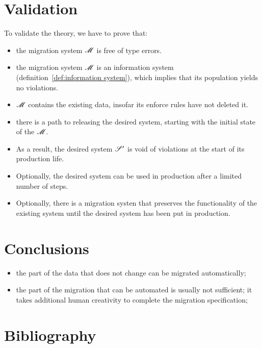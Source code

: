 \documentclass{elsarticle}
\begin{document}
\section{Validation}
   To validate the theory, we have to prove that:
\begin{itemize}
   \item the migration system $\mathscr{M}$ is free of type errors.
   \item the migration system $\mathscr{M}$ is an information system (definition~\ref{def:information system}),
         which implies that its population yields no violations.
   \item $\mathscr{M}$ contains the existing data, insofar its enforce rules have not deleted it.
   \item there is a path to releasing the desired system, starting with the initial state of the $\mathscr{M}$.
   \item As a result, the desired system $\mathscr{S}'$ is void of violations at the start of its production life.
   \item Optionally, the desired system can be used in production after a limited number of steps.
   \item Optionally, there is a migration systen that preserves the functionality of the existing system until the desired system has been put in production.
\end{itemize}

\section{Conclusions}
\begin{itemize}
   \item the part of the data that does not change can be migrated automatically;
   \item the part of the migration that can be automated is usually not sufficient;
         it takes additional human creativity to complete the migration specification;
\end{itemize}
\section{Bibliography}


\end{document}
